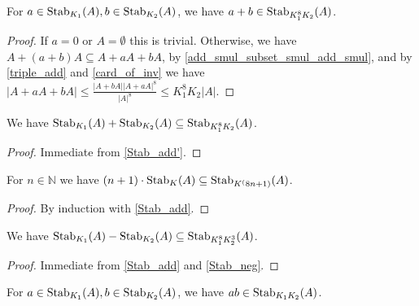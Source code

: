 \begin{lemma}
    \label{Stab_add'}
    \leanok
    For $a \in \operatorname{\operatorname{Stab}}_{K_1}(A), b \in \operatorname{\operatorname{Stab}}_{K_2}(A)$, we have $a+b \in \operatorname{\operatorname{Stab}}_{K_1^8 K_2}(A)$.
\end{lemma}

\begin{proof}
    If $a = 0$ or $A = \emptyset$ this is trivial. Otherwise, we have $A + (a+b) A \subseteq A + a A + b A$, by \ref{add_smul_subset_smul_add_smul},
    and by \ref{triple_add} and \ref{card_of_inv} we have $|A + a A + b A| \leq \frac{|A + bA| |A + aA|^8} {|A|^8} \leq K_1^8 K_2 |A|$.
\end{proof}

\begin{lemma}
    \label{Stab_add}
    \leanok
    We have $\operatorname{\operatorname{Stab}}_{K_1}(A) + \operatorname{\operatorname{Stab}}_{K_2}(A) \subseteq \operatorname{\operatorname{Stab}}_{K_1^8 K_2}(A)$.
\end{lemma}

\begin{proof}
    \leanok
    Immediate from \ref{Stab_add'}.
\end{proof}

\begin{lemma}
    \label{Stab_nsmul}
    \leanok
    For $n \in \mathbb{N}$ we have $(n+1) \cdot \operatorname{\operatorname{Stab}}_{K}(A) \subseteq \operatorname{\operatorname{Stab}}_{K^(8n + 1)}(A)$.
\end{lemma}

\begin{proof}
    \leanok
    By induction with \ref{Stab_add}.
\end{proof}

\begin{lemma}
    \label{Stab_sub}
    \leanok
    We have $\operatorname{\operatorname{Stab}}_{K_1}(A) - \operatorname{\operatorname{Stab}}_{K_2}(A) \subseteq \operatorname{\operatorname{Stab}}_{K_1^8 K_2^3}(A)$.
\end{lemma}

\begin{proof}
    \leanok
    Immediate from \ref{Stab_add} and \ref{Stab_neg}.
\end{proof}

\begin{lemma}
    \label{Stab_mul'}
    \leanok
    For $a \in \operatorname{\operatorname{Stab}}_{K_1}(A), b \in \operatorname{\operatorname{Stab}}_{K_2}(A)$, we have $ab \in \operatorname{\operatorname{Stab}}_{K_1 K_2}(A)$.
\end{lemma}

